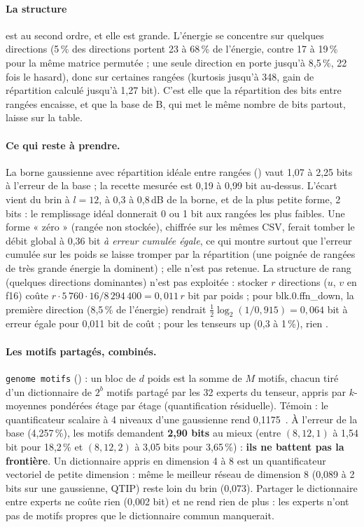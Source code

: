 \paragraph{La structure} est au second ordre, et elle est grande. L'énergie se concentre sur quelques directions (5\,\% des directions portent 23 à 68\,\% de l'énergie, contre 17 à 19\,\% pour la même matrice permutée ; une seule direction en porte jusqu'à 8,5\,\%, 22 fois le hasard), donc sur certaines rangées (kurtosis jusqu'à 348, gain de répartition calculé jusqu'à 1,27 bit). C'est elle que la répartition des bits entre rangées encaisse, et que la base de B, qui met le même nombre de bits partout, laisse sur la table.

\paragraph{Ce qui reste à prendre.} La borne gaussienne avec répartition idéale entre rangées () vaut 1,07 à 2,25 bits à l'erreur de la base ; la recette mesurée est 0,19 à 0,99 bit au-dessus. L'écart vient du brin à $l = 12$, à 0,3 à 0,8\,dB de la borne, et de la plus petite forme, 2 bits : le remplissage idéal donnerait 0 ou 1 bit aux rangées les plus faibles. Une forme « zéro » (rangée non stockée), chiffrée sur les mêmes CSV, ferait tomber le débit global à 0,36 bit \emph{à erreur cumulée égale}, ce qui montre surtout que l'erreur cumulée sur les poids se laisse tromper par la répartition (une poignée de rangées de très grande énergie la dominent) ; elle n'est pas retenue. La structure de rang (quelques directions dominantes) n'est pas exploitée : stocker $r$ directions ($u$, $v$ en f16) coûte $r \cdot 5\,760 \cdot 16 / 8\,294\,400 = 0{,}011\,r$ bit par poids ; pour blk.0.ffn\_down, la première direction (8,5\,\% de l'énergie) rendrait $\frac12\log_2(1/0{,}915) = 0{,}064$ bit à erreur égale pour 0,011 bit de coût ; pour les tenseurs up (0,3 à 1\,\%), rien \calc.

\paragraph{Les motifs partagés, combinés.} \texttt{genome motifs} () : un bloc de $d$ poids est la somme de $M$ motifs, chacun tiré d'un dictionnaire de $2^b$ motifs partagé par les 32 experts du tenseur, appris par $k$-moyennes pondérées étage par étage (quantification résiduelle). Témoin : le quantificateur scalaire à 4 niveaux d'une gaussienne rend 0,1175~\cite{max1960}. À l'erreur de la base (4,257\,\%), les motifs demandent \textbf{2,90 bits} au mieux (entre $(8, 12, 1)$ à 1,54 bit pour 18,2\,\% et $(8, 12, 2)$ à 3,05 bits pour 3,65\,\%) : \textbf{ils ne battent pas la frontière}. Un dictionnaire appris en dimension 4 à 8 est un quantificateur vectoriel de petite dimension : même le meilleur réseau de dimension 8 (0,089 à 2 bits sur une gaussienne, QTIP) reste loin du brin (0,073). Partager le dictionnaire entre experts ne coûte rien (0,002 bit) et ne rend rien de plus : les experts n'ont pas de motifs propres que le dictionnaire commun manquerait.

